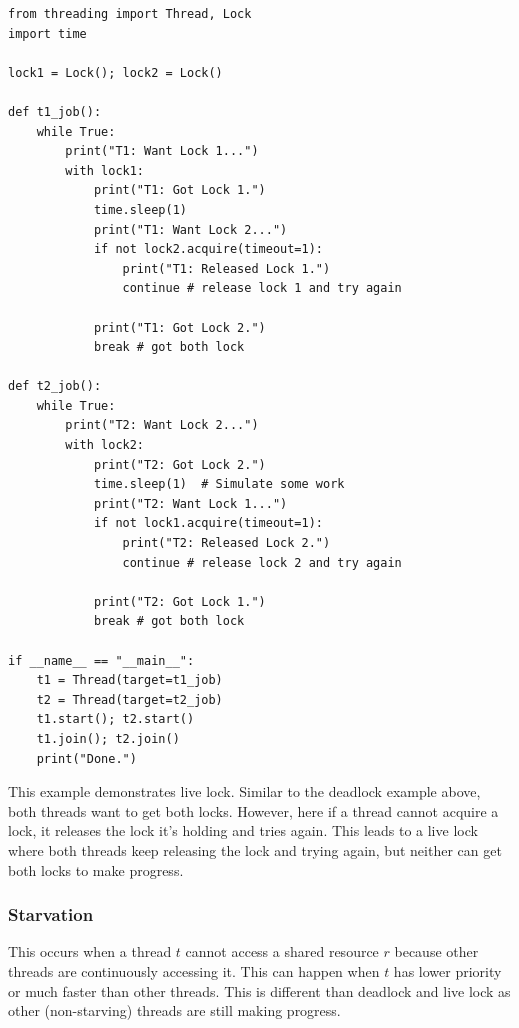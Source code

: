 \documentclass[oneside,11pt,dvipsnames]{book}
\newcommand{\code}[1]{\texttt{#1}}
\begin{document}
\begin{lstlisting}[multicols=2]
from threading import Thread, Lock
import time

lock1 = Lock(); lock2 = Lock()

def t1_job():
    while True:
        print("T1: Want Lock 1...")
        with lock1:
            print("T1: Got Lock 1.")
            time.sleep(1) 
            print("T1: Want Lock 2...")
            if not lock2.acquire(timeout=1):
                print("T1: Released Lock 1.")
                continue # release lock 1 and try again

            print("T1: Got Lock 2.")
            break # got both lock

def t2_job():
    while True:
        print("T2: Want Lock 2...")
        with lock2:
            print("T2: Got Lock 2.")
            time.sleep(1)  # Simulate some work
            print("T2: Want Lock 1...")
            if not lock1.acquire(timeout=1):
                print("T2: Released Lock 2.")
                continue # release lock 2 and try again
            
            print("T2: Got Lock 1.")
            break # got both lock

if __name__ == "__main__":
    t1 = Thread(target=t1_job)
    t2 = Thread(target=t2_job)
    t1.start(); t2.start()
    t1.join(); t2.join()
    print("Done.")
\end{lstlisting}

This example demonstrates live lock. Similar to the deadlock example above, both threads want to get both locks. However, here if a thread cannot acquire a lock, it releases the lock it's holding and tries again. This leads to a live lock where both threads keep releasing the lock and trying again, but neither can get both locks to make progress.


\subsubsection{Starvation} 

This occurs when a thread $t$ cannot access a shared resource $r$ because other threads are continuously accessing it. This can happen when $t$ has lower priority or much faster than other threads. This is different than deadlock and live lock as other (non-starving) threads are still making progress.

% 
\end{document}
